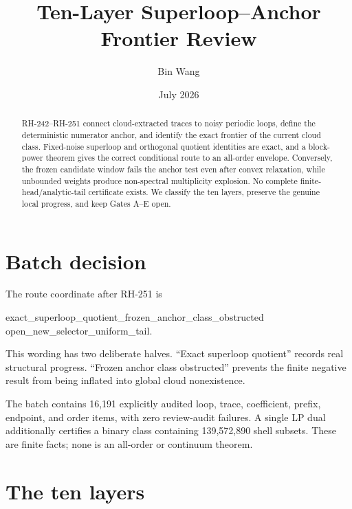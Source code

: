 \documentclass[11pt]{article}
\title{Ten-Layer Superloop--Anchor Frontier Review}
\author{Bin Wang}
\date{July 2026}
\begin{document}
\maketitle

\begin{abstract}
RH-242--RH-251 connect cloud-extracted traces to noisy periodic loops, define
the deterministic numerator anchor, and identify the exact frontier of the
current cloud class.  Fixed-noise superloop and orthogonal quotient identities
are exact, and a block-power theorem gives the correct conditional route to
an all-order envelope.  Conversely, the frozen candidate window fails the
anchor test even after convex relaxation, while unbounded weights produce
non-spectral multiplicity explosion.  No complete finite-head/analytic-tail
certificate exists.  We classify the ten layers, preserve the genuine local
progress, and keep Gates A--E open.
\end{abstract}

\section{Batch decision}

The route coordinate after RH-251 is
\begin{center}
\ttfamily
exact\_superloop\_quotient\_frozen\_anchor\_class\_obstructed\\
open\_new\_selector\_uniform\_tail.
\end{center}
This wording has two deliberate halves.  ``Exact superloop quotient'' records
real structural progress.  ``Frozen anchor class obstructed'' prevents the
finite negative result from being inflated into global cloud nonexistence.

The batch contains 16,191 explicitly audited loop, trace, coefficient,
prefix, endpoint, and order items, with zero review-audit failures.  A single
LP dual additionally certifies a binary class containing 139,572,890 shell
subsets.  These are finite facts; none is an all-order or continuum theorem.

\section{The ten layers}
\end{document}
